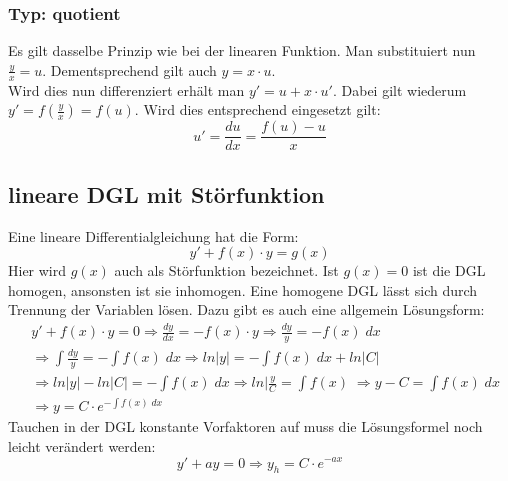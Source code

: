 \documentclass[a4paper,10pt]{scrartcl}
\begin{document}
        \subsubsection{Typ: quotient}
        Es gilt dasselbe Prinzip wie bei der linearen Funktion. Man substituiert nun \(\frac{y}{x} = u\). Dementsprechend gilt auch \(y = x \cdot u\). \\
        Wird dies nun differenziert erhält man \(y' = u + x \cdot u'\). Dabei gilt wiederum \(y' = f(\frac{y}{x}) = f(u)\). Wird dies entsprechend eingesetzt gilt:
        \begin{equation}
            u' = \frac{du}{dx} = \frac{f(u) - u}{x}     
        \end{equation} 

        \subsection{lineare DGL mit Störfunktion}
        Eine lineare Differentialgleichung hat die Form: 
        \begin{equation}
            y' + f(x) \cdot y = g(x)
        \end{equation}
        Hier wird \(g(x)\) auch als Störfunktion bezeichnet. Ist \(g(x) = 0\) ist die DGL homogen, ansonsten ist sie inhomogen. Eine homogene DGL lässt sich 
        durch Trennung der Variablen lösen. Dazu gibt es auch eine allgemein Lösungsform:
        \begin{equation}    
            \begin{aligned}
                & y' + f(x) \cdot y = 0 \Rightarrow \frac{dy}{dx} = -f(x) \cdot y \Rightarrow \frac{dy}{y} = -f(x) \; dx\\
                & \Rightarrow \int \frac{dy}{y} = - \int f(x) \; dx \Rightarrow ln|y| = - \int f(x) \; dx + ln|C| \\
                & \Rightarrow ln |y| - ln|C| = - \int f(x) \; dx \Rightarrow ln|\frac{y}{C} = \int f(x) \; \Rightarrow y - C = \int f(x) \; dx \\
                & \Rightarrow y = C \cdot e^{- \int f(x) \; dx}    
            \end{aligned}
        \end{equation}  
        Tauchen in der DGL konstante Vorfaktoren auf muss die Lösungsformel noch leicht verändert werden:
        \begin{equation}
            y' + ay = 0 \Rightarrow y_h = C \cdot e^{-ax}
        \end{equation}
\end{document}
